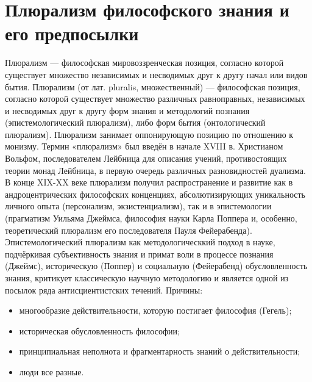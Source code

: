 \documentclass[12pt]{article}
\begin{document}
\section{Плюрализм философского знания и его предпосылки}
Плюрализм --- философская мировоззренческая позиция, согласно которой существует множество независимых
и несводимых друг к другу начал или видов бытия. 
Плюрализм (от лат. pluralis, множественный) --- философская позиция, согласно которой существует множество
различных равноправных,  независимых и несводимых друг к другу форм знания и методологий познания
(эпистемологический  плюрализм), либо  форм  бытия  (онтологический  плюрализм).  Плюрализм  занимает
оппонирующую позицию по отношению к монизму. 
Термин  «плюрализм»  был  введён  в  начале  XVIII  в.  Христианом  Вольфом,  последователем  Лейбница  для
описания  учений,  противостоящих  теории  монад  Лейбница,  в  первую  очередь  различных  разновидностей
дуализма.
В конце XIX-XX веке плюрализм получил распространение и развитие как в андроцентрических философских
конценциях,  абсолютизирующих  уникальность  личного  опыта  (персонализм,  экзистенциализм),  так  и  в
эпистемологии (прагматизм Уильяма Джеймса, философия науки Карла Поппера и, особенно, теоретический
плюрализм его последователя Пауля Фейерабенда).
Эпистемологический плюрализм как методологическкий подход в науке, подчёркивая субъективность знания и
примат  воли  в  процессе  познания  (Джеймс),  историческую  (Поппер)  и  социальную  (Фейерабенд)
обусловленность знания, критикует классическую научную методологию и является одной из посылок ряда
антисциентистских течений.
Причины:
\begin{itemize}
  \item многообразие действительности, которую постигает философия (Гегель);
  \item историческая обусловленность философии;
  \item принципиальная неполнота и фрагментарность знаний о действительности;
  \item люди все разные.
\end{itemize}

\newpage
\end{document}
